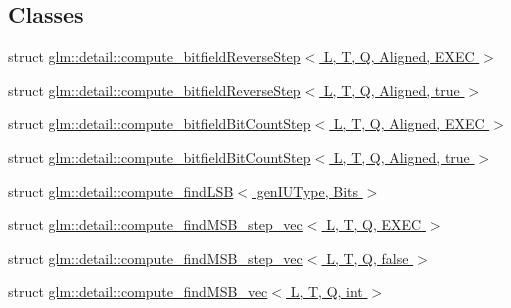 \subsection*{Classes}
\begin{DoxyCompactItemize}
\item 
struct \hyperlink{structglm_1_1detail_1_1compute__bitfieldReverseStep}{glm\+::detail\+::compute\+\_\+bitfield\+Reverse\+Step$<$ L, T, Q, Aligned, E\+X\+E\+C $>$}
\item 
struct \hyperlink{structglm_1_1detail_1_1compute__bitfieldReverseStep_3_01L_00_01T_00_01Q_00_01Aligned_00_01true_01_4}{glm\+::detail\+::compute\+\_\+bitfield\+Reverse\+Step$<$ L, T, Q, Aligned, true $>$}
\item 
struct \hyperlink{structglm_1_1detail_1_1compute__bitfieldBitCountStep}{glm\+::detail\+::compute\+\_\+bitfield\+Bit\+Count\+Step$<$ L, T, Q, Aligned, E\+X\+E\+C $>$}
\item 
struct \hyperlink{structglm_1_1detail_1_1compute__bitfieldBitCountStep_3_01L_00_01T_00_01Q_00_01Aligned_00_01true_01_4}{glm\+::detail\+::compute\+\_\+bitfield\+Bit\+Count\+Step$<$ L, T, Q, Aligned, true $>$}
\item 
struct \hyperlink{structglm_1_1detail_1_1compute__findLSB}{glm\+::detail\+::compute\+\_\+find\+L\+S\+B$<$ gen\+I\+U\+Type, Bits $>$}
\item 
struct \hyperlink{structglm_1_1detail_1_1compute__findMSB__step__vec}{glm\+::detail\+::compute\+\_\+find\+M\+S\+B\+\_\+step\+\_\+vec$<$ L, T, Q, E\+X\+E\+C $>$}
\item 
struct \hyperlink{structglm_1_1detail_1_1compute__findMSB__step__vec_3_01L_00_01T_00_01Q_00_01false_01_4}{glm\+::detail\+::compute\+\_\+find\+M\+S\+B\+\_\+step\+\_\+vec$<$ L, T, Q, false $>$}
\item 
struct \hyperlink{structglm_1_1detail_1_1compute__findMSB__vec}{glm\+::detail\+::compute\+\_\+find\+M\+S\+B\+\_\+vec$<$ L, T, Q, int $>$}
\end{DoxyCompactItemize}
